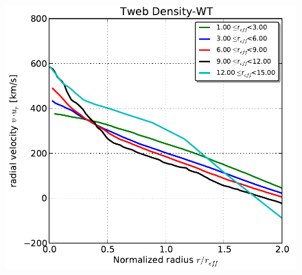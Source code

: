 \documentclass[a4,useAMS,usenatbib,usegraphicx]{latex/mn2e}
\begin{document}
\begin{flushleft}
\begin{figure}
  \includegraphics[trim = 1mm 2mm 4mm 0mm, clip, keepaspectratio=true,
  width=0.24\textheight]{./figures/voids_velocity_TwebDLG.pdf}
  

  \label{fig:RhoVel}
  \vspace{0.1 cm}

\end{figure}
\end{flushleft}
\end{document}

